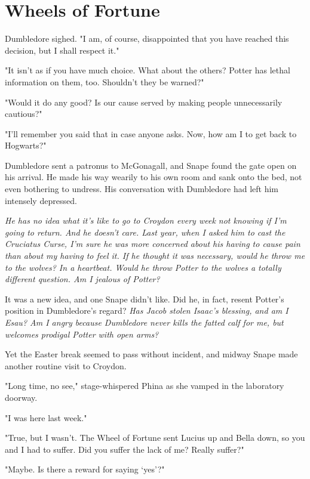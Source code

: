 
\chapter{Wheels of Fortune}

Dumbledore sighed. "I am, of course, disappointed that you have reached this decision, but I shall respect it."

"It isn't as if you have much choice. What about the others? Potter has lethal information on them, too. Shouldn't they be warned?"

"Would it do any good? Is our cause served by making people unnecessarily cautious?"

"I'll remember you said that in case anyone asks. Now, how am I to get back to Hogwarts?"

Dumbledore sent a patronus to McGonagall, and Snape found the gate open on his arrival. He made his way wearily to his own room and sank onto the bed, not even bothering to undress. His conversation with Dumbledore had left him intensely depressed.

\emph{He has no idea what it's like to go to Croydon every week not knowing if I'm going to return. And he doesn't care. Last year, when I asked him to cast the Cruciatus Curse, I'm sure he was more concerned about his having to cause pain than about my having to feel it. If he thought it was necessary, would he throw me to the wolves? In a heartbeat. Would he throw Potter to the wolves{\el} a totally different question. Am I jealous of Potter?}

It was a new idea, and one Snape didn't like. Did he, in fact, resent Potter's position in Dumbledore's regard? \emph{Has Jacob stolen Isaac's blessing, and am I Esau? Am I angry because Dumbledore never kills the fatted calf for me, but welcomes prodigal Potter with open arms?}

Yet the Easter break seemed to pass without incident, and midway Snape made another routine visit to Croydon.

"Long time, no see," stage-whispered Phina as she vamped in the laboratory doorway.

"I was here last week."

"True, but I wasn't. The Wheel of Fortune sent Lucius up and Bella down, so you and I had to suffer. Did you suffer the lack of me? Really suffer?"

"Maybe. Is there a reward for saying `yes'?"

